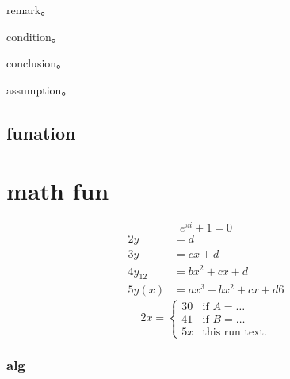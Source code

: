 \documentclass[writingLanguage=english, %
    addPageTitle=on,  %
    addDeclaration=on, %
    addMUSTlogo=on, %
    addFigTOC=on, %
    addTabTOC=on, %
    refIndent=off, %
    printMod=off, %
]{.def/must}
\begin{document}
\begin{remark}
 remark。
\end{remark}



\begin{condition}
 condition。
\end{condition}



\begin{conclusion}
 conclusion。
\end{conclusion}


\begin{assumption}
 assumption。
\end{assumption}






\section{funation}









\chapter{math fun}
\begin{equation}
\label{eq1}
e^{\pi i}+1=0
\end{equation}
\begin{align}
2 y & =d\label{eq:IntoSection}\\
3 y & =cx+d\\
4 y_{12} & =bx^{2}+cx+d\\
5 y(x) & =ax^{3}+bx^{2}+cx+d
6 
\end{align}
\begin{equation}
2 x=\left\{ \begin{array}{cl}
3 0 & \textrm{if }A=\ldots\\
4 1 & \textrm{if }B=\ldots\\
5 x & \textrm{this run  text.}\end
{array}\right.
\end{equation}       


\subsection{alg}

 
\end{document}
